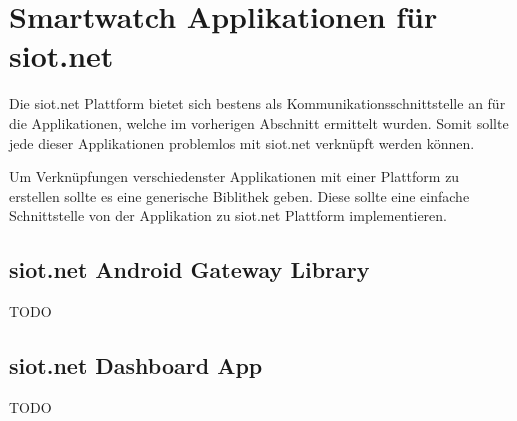 \section{Smartwatch Applikationen für siot.net}

Die siot.net Plattform bietet sich bestens als Kommunikationsschnittstelle an für die Applikationen, welche im vorherigen Abschnitt ermittelt wurden.
Somit sollte jede dieser Applikationen problemlos mit siot.net verknüpft werden können.

Um Verknüpfungen verschiedenster Applikationen mit einer Plattform zu erstellen sollte es eine generische Biblithek geben.
Diese sollte eine einfache Schnittstelle von der Applikation zu siot.net Plattform implementieren.

\subsection{siot.net Android Gateway Library}

TODO

\subsection{siot.net Dashboard App}

TODO
